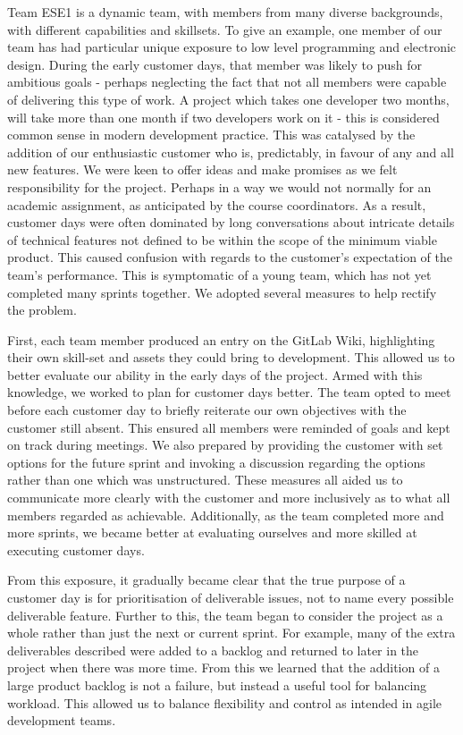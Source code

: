 \documentclass{l3proj}
\begin{document}
Team ESE1 is a dynamic team, with members from many diverse backgrounds, with different capabilities and skillsets. To give an example, one member of our team has had particular unique exposure to low level programming and electronic design. During the early customer days, that member was likely to push for ambitious goals - perhaps neglecting the fact that not all members were capable of delivering this type of work. A project which takes one developer two months, will take more than one month if two developers work on it\cite{brooks} - this is considered common sense in modern development practice\cite{hanakawa}. This was catalysed by the addition of our enthusiastic customer who is, predictably, in favour of any and all new features. We were keen to offer ideas and make promises as we felt responsibility for the project. Perhaps in a way we would not normally for an academic assignment, as anticipated by the course coordinators\cite{simpson}. As a result, customer days were often dominated by long conversations about intricate details of technical features not defined to be within the scope of the minimum viable product. This caused confusion with regards to the customer's expectation of the team's performance. This is symptomatic of a young team, which has not yet completed many sprints together. We adopted several measures to help rectify the problem. 

First, each team member produced an entry on the GitLab Wiki, highlighting their own skill-set and assets they could bring to development. This allowed us to better evaluate our ability in the early days of the project. Armed with this knowledge, we worked to plan for customer days better. The team opted to meet before each customer day to briefly reiterate our own objectives with the customer still absent. This ensured all members were reminded of goals and kept on track during meetings. We also prepared by providing the customer with set options for the future sprint and invoking a discussion regarding the options rather than one which was unstructured. These measures all aided us to communicate more clearly with the customer and more inclusively as to what all members regarded as achievable. Additionally, as the team completed more and more sprints, we became better at evaluating ourselves and more skilled at executing customer days.

From this exposure, it gradually became clear that the true purpose of a customer day is for prioritisation of deliverable issues, not to name every possible deliverable feature. Further to this, the team began to consider the project as a whole rather than just the next or current sprint. For example, many of the extra deliverables described were added to a backlog and returned to later in the project when there was more time. From this we learned that the addition of a large product backlog is not a failure, but instead a useful tool for balancing workload. This allowed us to balance flexibility and control as intended in agile development teams\cite{rising}.
\end{document}
